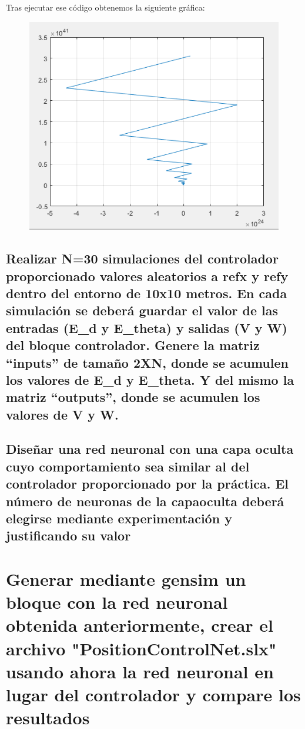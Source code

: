 \documentclass[12pt]{article}
\begin{document}
Tras ejecutar ese código obtenemos la siguiente gráfica:
\begin{figure}[!htb]
    \centering
    \includegraphics[scale=0.5]{./imagens/TrayectoriaRobot.png}
\end{figure}

\subsection{Realizar N=30 simulaciones del controlador proporcionado valores aleatorios a refx y refy dentro del entorno de 10x10 metros. En cada simulación se deberá guardar el valor de las entradas (E\_d y E\_theta) y salidas (V y W) del bloque controlador. Genere la matriz “inputs” de tamaño 2XN, donde se acumulen los valores de E\_d y E\_theta. Y del mismo la matriz “outputs”, donde se acumulen los valores de V y W. 
 }


\subsection{Diseñar una red neuronal con una capa oculta cuyo comportamiento sea similar al del controlador proporcionado por la práctica. El número de neuronas de la capaoculta deberá elegirse mediante experimentación y justificando su valor}

\section{Generar mediante gensim un bloque con la red neuronal obtenida anteriormente, crear el archivo "PositionControlNet.slx" usando ahora la red neuronal en lugar del controlador y compare los resultados}
\end{document}
